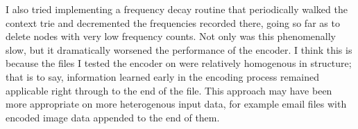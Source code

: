 \documentclass[11pt]{article}
\begin{document}
I also tried implementing a frequency decay routine that periodically walked the context trie and decremented the frequencies recorded there, going so far as to delete nodes with very low frequency counts. Not only was this phenomenally slow, but it dramatically worsened the performance of the encoder. I think this is because the files I tested the encoder on were relatively homogenous in structure; that is to say, information learned early in the encoding process remained applicable right through to the end of the file. This approach may have been more appropriate on more heterogenous input data, for example email files with encoded image data appended to the end of them.

\printbibliography
\end{document}
